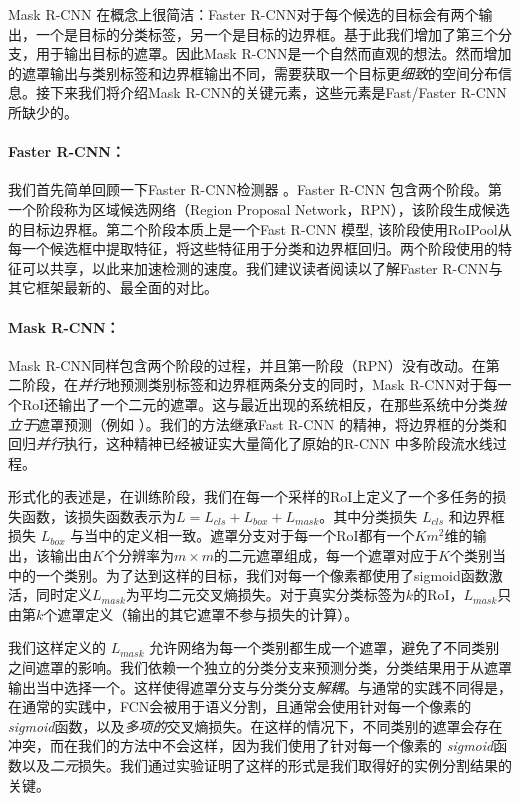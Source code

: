 \label{sec:maskR-CNN}

Mask R-CNN 在概念上很简洁：Faster R-CNN对于每个候选的目标会有两个输出，一个是目标的分类标签，另一个是目标的边界框。基于此我们增加了第三个分支，用于输出目标的遮罩。因此Mask R-CNN是一个自然而直观的想法。然而增加的遮罩输出与类别标签和边界框输出不同，需要获取一个目标更\emph{细致}的空间分布信息。接下来我们将介绍Mask R-CNN的关键元素，这些元素是Fast/Faster R-CNN所缺少的。

\paragraph{Faster R-CNN：} 我们首先简单回顾一下Faster R-CNN检测器 。Faster R-CNN 包含两个阶段。第一个阶段称为区域候选网络（Region Proposal Network，RPN），该阶段生成候选的目标边界框。第二个阶段本质上是一个Fast R-CNN 模型, 该阶段使用RoIPool从每一个候选框中提取特征，将这些特征用于分类和边界框回归。两个阶段使用的特征可以共享，以此来加速检测的速度。我们建议读者阅读以了解Faster R-CNN与其它框架最新的、最全面的对比。

\paragraph{Mask R-CNN：} Mask R-CNN同样包含两个阶段的过程，并且第一阶段（RPN）没有改动。在第二阶段，在\emph{并行}地预测类别标签和边界框两条分支的同时，Mask R-CNN对于每一个RoI还输出了一个二元的遮罩。这与最近出现的系统相反，在那些系统中分类\emph{独立于}遮罩预测（例如 ）。我们的方法继承Fast R-CNN 的精神，将边界框的分类和回归\emph{并行}执行，这种精神已经被证实大量简化了原始的R-CNN 中多阶段流水线过程。

形式化的表述是，在训练阶段，我们在每一个采样的RoI上定义了一个多任务的损失函数，该损失函数表示为$L = L_{cls} + L_{box} + L_{mask}$。其中分类损失 $L_{cls}$ 和边界框损失 $L_{box}$ 与当中的定义相一致。遮罩分支对于每一个RoI都有一个$Km^2$维的输出，该输出由$K$个分辨率为$m \times m$的二元遮罩组成，每一个遮罩对应于$K$个类别当中的一个类别。为了达到这样的目标，我们对每一个像素都使用了sigmoid函数激活，同时定义$L_{mask}$为平均二元交叉熵损失。对于真实分类标签为$k$的RoI，$L_{mask}$只由第$k$个遮罩定义（输出的其它遮罩不参与损失的计算）。

我们这样定义的 $L_{mask}$ 允许网络为每一个类别都生成一个遮罩，避免了不同类别之间遮罩的影响。我们依赖一个独立的分类分支来预测分类，分类结果用于从遮罩输出当中选择一个。这样使得遮罩分支与分类分支\emph{解耦}。与通常的实践不同得是，在通常的实践中，FCN会被用于语义分割，且通常会使用针对每一个像素的\emph{sigmoid}函数，以及\emph{多项的}交叉熵损失。在这样的情况下，不同类别的遮罩会存在冲突，而在我们的方法中不会这样，因为我们使用了针对每一个像素的 \emph{sigmoid}函数以及\emph{二元}损失。我们通过实验证明了这样的形式是我们取得好的实例分割结果的关键。

